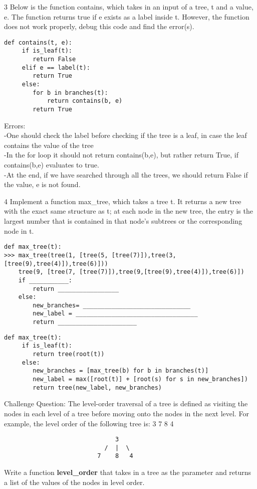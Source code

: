 \begin{paragraph}
3 Below is the function contains, which takes in an input of a tree, t and a value, e. The function returns true if e exists as a label inside t. However, the function does not work properly, debug this code and find the error(s). 
\end{paragraph}
\begin{lstlisting}
def contains(t, e):
     if is_leaf(t):
        return False
     elif e == label(t):
        return True
     else:
        for b in branches(t):
            return contains(b, e)
        return True
\end{lstlisting}
\begin{solution}
Errors: \\
-One should check the label before checking if the tree is a leaf, in case the leaf contains the value of the tree \\
-In the for loop it should not return contains(b,e), but rather return True, if contains(b,e) evaluates to true. \\ 
-At the end, if we have searched through all the trees, we should return False if the value, e is not found.  

\end{solution}
\begin{paragraph}
4 Implement a function max\_tree, which takes a tree t. It returns a new tree with the exact same structure as t; at each node in the new tree, the entry is the largest number that is contained in that node's subtrees or the corresponding node in t. 
\end{paragraph}
\begin{lstlisting}
def max_tree(t):
>>> max_tree(tree(1, [tree(5, [tree(7)]),tree(3,[tree(9),tree(4)]),tree(6)]))
    tree(9, [tree(7, [tree(7)]),tree(9,[tree(9),tree(4)]),tree(6)])
    if ___________:
        return _________________
    else:
    	new_branches= ______________________________
    	new_label = __________________________________
    	return ______________________
\end{lstlisting}
\begin{solution}
\begin{lstlisting}
def max_tree(t):
     if is_leaf(t):
    	return tree(root(t))
     else:
    	new_branches = [max_tree(b) for b in branches(t)]
    	new_label = max([root(t)] + [root(s) for s in new_branches])
    	return tree(new_label, new_branches)
\end{lstlisting}
\end{solution}
\newpage
\question
Challenge Question: The level-order traversal of a tree is defined as visiting the nodes in each level of a tree before moving onto the nodes in the next level. For example, the level order of the following tree is: 3 7 8 4 
\begin{verbatim}
                               3
                            /  |  \
                          7    8   4 
\end{verbatim}
 Write a function \textbf{level\_order} that takes in a tree as the parameter and returns a list of the values of the nodes in level order. 
 
